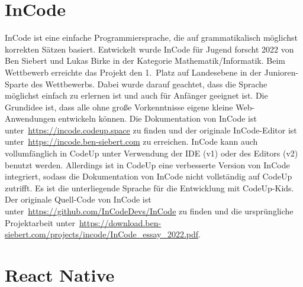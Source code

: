\documentclass[main.tex]{subfiles}
\begin{document}
    \section{InCode}\label{sec:incodedoc}
    InCode ist eine einfache Programmiersprache, die auf grammatikalisch möglichst korrekten Sätzen basiert.
    Entwickelt wurde InCode für Jugend forscht 2022 von Ben Siebert und Lukas Birke in der Kategorie Mathematik/Informatik.
    Beim Wettbewerb erreichte das Projekt den 1.~Platz auf Landesebene in der Junioren-Sparte des Wettbewerbs.
    Dabei wurde darauf geachtet, dass die Sprache möglichst einfach zu erlernen ist und auch für Anfänger geeignet ist.
    Die Grundidee ist, dass alle ohne große Vorkenntnisse eigene kleine Web-Anwendungen entwickeln können.
    Die Dokumentation von InCode ist unter~\url{https://incode.codeup.space} zu finden und der originale InCode-Editor ist unter~\url{https://incode.ben-siebert.com} zu erreichen.
    InCode kann auch vollumfänglich in CodeUp unter Verwendung der IDE (v1) oder des Editors (v2) benutzt werden.
    Allerdings ist in CodeUp eine verbesserte Version von InCode integriert, sodass die Dokumentation von InCode nicht vollständig auf CodeUp zutrifft.
    Es ist die unterliegende Sprache für die Entwicklung mit CodeUp-Kids.
    Der originale Quell-Code von InCode ist unter~\url{https://github.com/InCodeDevs/InCode} zu finden und die ursprüngliche Projektarbeit unter~\url{https://download.ben-siebert.com/projects/incode/InCode_essay_2022.pdf}.
    \section{React Native}\label{sec:react-native}
\end{document}
